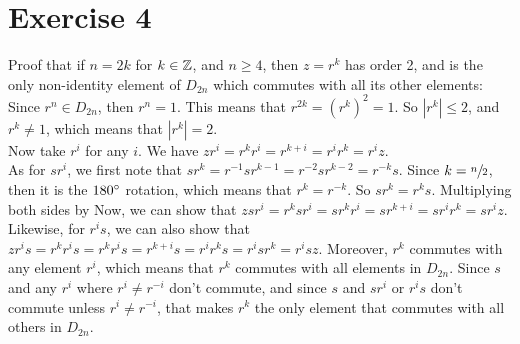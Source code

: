 \documentclass[12pt]{article}
\begin{document}
    \section*{Exercise 4}
    Proof that if $n = 2k$ for $k \in \mathbb{Z}$,
    and $n \geqslant 4$,
    then $z = r^k$ has order 2,
    and is the only non-identity element of $D_{2n}$
    which commutes with all its other elements: \\
    Since $r^n \in D_{2n}$,
    then $r^n = 1$.
    This means that $r^{2k} = (r^k)^2 = 1$.
    So $|r^k| \leqslant 2$,
    and $r^k \neq 1$,
    which means that $|r^k| = 2$. \\
    Now take $r^i$ for any $i$.
    We have $zr^i = r^kr^i = r^{k+i} = r^ir^k = r^iz$. \\
    As for $sr^i$,
    we first note that $sr^k = r^{-1}sr^{k-1} 
    = r^{-2}sr^{k-2}
    = r^{-k}s$.
    Since $k = \sfrac{n}{2}$,
    then it is the $180 \degree$ rotation, which means that $r^k = r^{-k}$.
    So $sr^k = r^ks$.
    Multiplying both sides by 
    Now, we can show that $zsr^i = r^ksr^i
    = sr^kr^i
    = sr^{k + i}
    = sr^ir^k
    = sr^iz$.
    Likewise, for $r^is$,
    we can also show that $zr^is = r^kr^is
    = r^kr^is
    = r^{k + i}s
    = r^ir^ks
    = r^isr^k
    = r^isz$.
    Moreover, $r^k$ commutes with any element $r^i$,
    which means that $r^k$ commutes with all elements in $D_{2n}$.
    Since $s$ and any $r^i$ where $r^i \neq r^{-i}$ don't commute,
    and since $s$ and $sr^i$ or $r^is$ don't commute unless $r^i \neq r^{-i}$,
    that makes $r^k$ the only element that commutes with all others
    in $D_{2n}$.
\end{document}
